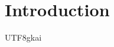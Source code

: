 \documentclass[11pt]{article}
\begin{document}
\section{Introduction}
\begin{CJK}{UTF8}{gkai}






\end{CJK}
\end{document}
